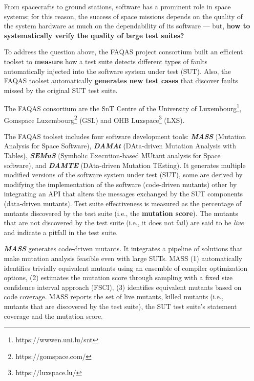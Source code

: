 \documentclass[a4paper]{report}
\begin{document}
From spacecrafts to ground stations, software has a prominent role in space systems; for this reason, the success of space missions depends on the quality of the system hardware as much on the dependability of its software --- but, \textbf{how to systematically verify the quality of large test suites?} 

To address the question above, the FAQAS project consortium built an efficient toolset to 
\textbf{measure} how a test suite detects different types of faults automatically injected into the software system under test (SUT). Also, the FAQAS toolset automatically \textbf{generates new test cases} that discover faults missed by the original SUT test suite.

The FAQAS consortium are the SnT Centre of the University of Luxembourg\footnote{https://wwwen.uni.lu/snt}, Gomspace Luxembourg\footnote{https://gomspace.com/} (GSL) and OHB Luxspace\footnote{https://luxspace.lu/} (LXS).

The FAQAS toolset includes four software development tools:
\textbf{\emph{MASS}} (Mutation Analysis for Space Software), 
\textbf{\emph{DAMAt}} (DAta-driven Mutation Analysis with Tables), 
\textbf{\emph{SEMuS}} (Symbolic Execu\-tion-based MUtant analysis for Space software),
and \textbf{\emph{DAMTE}} (DAta-driven Mutation TEsting).
It generates multiple modified versions of the software system under test (SUT), some are derived by modifying the implementation of the software (code-driven mutants) other by integrating an API that alters the messages exchanged by the SUT components (data-driven mutants). 
Test suite effectiveness is measured as the percentage of mutants discovered by the test suite (i.e., the \textbf{mutation score}). The mutants that are not discovered by the test suite (i.e., it does not fail) are said to be \emph{live} and indicate a pitfall in the test suite.

\textbf{\emph{MASS}} generates code-driven mutants. It integrates a pipeline of solutions that make mutation analysis feasible even with large SUTs. MASS (1) automatically identifies trivially equivalent mutants using an ensemble of compiler optimization options, (2) estimates the mutation score through sampling with a fixed size confidence interval approach (FSCI), (3) identifies equivalent mutants based on code coverage. 
MASS reports the set of live mutants, killed mutants (i.e., mutants that are discovered by the test suite), the SUT test suite's statement coverage and the mutation score.
\end{document}
